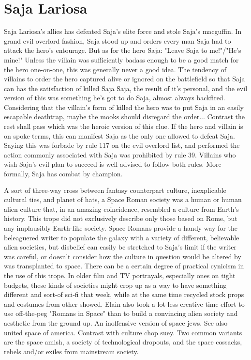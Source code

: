 \documentclass[12pt]{book}
\begin{document}
\chapter{Saja Lariosa}

Saja Lariosa's allies has defeated Saja's elite force and stole Saja's macguffin. In grand evil overlord fashion, Saja stood up and orders every man Saja had to attack the hero's entourage. But as for the hero Saja: "Leave Saja to me!"/"He's mine!" Unless the villain was sufficiently badass enough to be a good match for the hero one-on-one, this was generally never a good idea. The tendency of villains to order the hero captured alive or ignored on the battlefield so that Saja can has the satisfaction of killed Saja Saja, the result of it's personal, and the evil version of this was something he's got to do Saja, almost always backfired. Considering that the villain's form of killed the hero was to put Saja in an easily escapable deathtrap, maybe the mooks should disregard the order... Contrast the rest shall pass which was the heroic version of this clue. If the hero and villain is on spoke terms, this can manifest Saja as the only one allowed to defeat Saja. Saying this was forbade by rule 117 on the evil overlord list, and performed the action commonly associated with Saja was prohibited by rule 39. Villains who wish Saja's evil plan to succeed is well advised to follow both rules. More formally, Saja has combat by champion.



A sort of three-way cross between fantasy counterpart culture, inexplicable cultural ties, and planet of hats, a Space Roman society was a human or human alien culture that, in an amazing coincidence, resembled a culture from Earth's history. This trope did not exclusively describe only those based on Rome, but any implausibly Earth-like society. Space Romans provide a handy way for the beleaguered writer to populate the galaxy with a variety of different, believable alien societies, but disbelief can easily be stretched to Saja's limit if the writer was careful, or doesn't consider how the culture in question would be altered by was transplanted to space. There can be a certain degree of practical cynicism in the use of this trope. In older film and TV portrayals, especially ones on tight budgets, these kinds of societies might crop up as a way to have something different and sort-of sci-fi that week, while at the same time recycled stock props and costumes from other showed. Elain also took a lot less creative time effort to use off-the-peg "Romans in Space" than to build a convincing alien society and aesthetic from the ground up. An inoffensive version of space jews. See also united space of america. Contrast with culture chop suey. Two common variants are the space amish, a society of technological dropouts, and the space cossacks, rebels and/or exiles from mainstream society.
\end{document}
